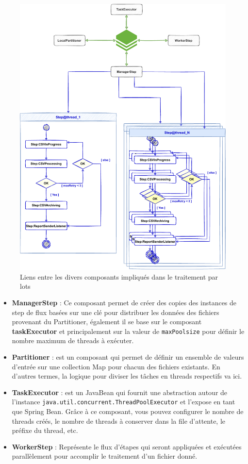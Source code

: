 \begin{figure}[!hbt]
    \begin{center}
        \includegraphics[width=\linewidth]{images/sec4/batchdiagram.pdf}
        \caption{Liens entre les divers composants impliqués dans le traitement par lots}
        \label{fig:batch}
    \end{center}
\end{figure}
\begin{itemize}
    \item \textbf{ManagerStep} : Ce composant permet de créer des copies des instances de step de flux basées sur une clé pour distribuer les données des fichiers provenant du Partitioner, également il se base sur le composant \textbf{taskExecutor} et principalement sur la valeur de \lstinline|maxPoolsize| pour définir le nombre maximum de threads à exécuter.
    \item \textbf{Partitioner} : est un composant qui permet de définir un ensemble de valeurs d'entrée sur une collection Map pour chacun des fichiers existants. En d'autres termes, la logique pour diviser les tâches en threads respectifs va ici.
    \item \textbf{TaskExecutor} : est un JavaBean qui fournit une abstraction autour de l'instance \lstinline|java.util.concurrent.ThreadPoolExecutor| et l'expose en tant que Spring Bean. Grâce à ce composant, vous pouvez configurer le nombre de threads créés, le nombre de threads à conserver dans la file d'attente, le préfixe du thread, etc.
    \item \textbf{WorkerStep} : Représente le flux d'étapes qui seront appliquées et exécutées parallèlement pour accomplir le traitement d'un fichier donné.\\
\end{itemize}
